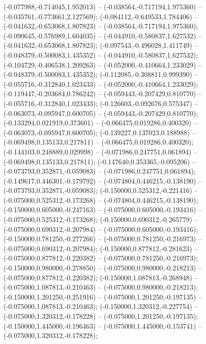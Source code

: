  (-0.077988,-0.714045,1.952013) -- (-0.038564,-0.717194,1.975360) -- (-0.035761,-0.773661,2.127569);
 (-0.084112,-0.649533,1.784406) -- (-0.041632,-0.653068,1.807823) -- (-0.038564,-0.717194,1.975360);
 (-0.090645,-0.576989,1.604035) -- (-0.044910,-0.580837,1.627532) -- (-0.041632,-0.653068,1.807823);
 (-0.097543,-0.496028,1.411749) -- (-0.048379,-0.500083,1.435352) -- (-0.044910,-0.580837,1.627532);
 (-0.104729,-0.406538,1.209263) -- (-0.052000,-0.410664,1.233029) -- (-0.048379,-0.500083,1.435352);
 (-0.112085,-0.308811,0.999390) -- (-0.055716,-0.312840,1.023433) -- (-0.052000,-0.410664,1.233029);
 (-0.119447,-0.203684,0.786242) -- (-0.059443,-0.207429,0.810770) -- (-0.055716,-0.312840,1.023433);
 (-0.126603,-0.092676,0.575347) -- (-0.063073,-0.095947,0.600705) -- (-0.059443,-0.207429,0.810770);
 (-0.133294,0.021919,0.373601) -- (-0.066475,0.019286,0.400320) -- (-0.063073,-0.095947,0.600705);
 (-0.139227,0.137023,0.188988) -- (-0.069498,0.135133,0.217811) -- (-0.066475,0.019286,0.400320);
 (-0.144103,0.248889,0.029998) -- (-0.071986,0.247751,0.061894) -- (-0.069498,0.135133,0.217811);
 (-0.147640,0.353365,-0.095206) -- (-0.073793,0.352871,-0.059083) -- (-0.071986,0.247751,0.061894);
 (-0.149617,0.446301,-0.179792) -- (-0.074804,0.446215,-0.138190) -- (-0.073793,0.352871,-0.059083);
 (-0.150000,0.525312,-0.221416) -- (-0.075000,0.525312,-0.173268) -- (-0.074804,0.446215,-0.138190);
 (-0.150000,0.605000,-0.247163) -- (-0.075000,0.605000,-0.193416) -- (-0.075000,0.525312,-0.173268);
 (-0.150000,0.690312,-0.265779) -- (-0.075000,0.690312,-0.207984) -- (-0.075000,0.605000,-0.193416);
 (-0.150000,0.781250,-0.277266) -- (-0.075000,0.781250,-0.216973) -- (-0.075000,0.690312,-0.207984);
 (-0.150000,0.877812,-0.281623) -- (-0.075000,0.877812,-0.220382) -- (-0.075000,0.781250,-0.216973);
 (-0.150000,0.980000,-0.278850) -- (-0.075000,0.980000,-0.218213) -- (-0.075000,0.877812,-0.220382);
 (-0.150000,1.087813,-0.268948) -- (-0.075000,1.087813,-0.210463) -- (-0.075000,0.980000,-0.218213);
 (-0.150000,1.201250,-0.251916) -- (-0.075000,1.201250,-0.197135) -- (-0.075000,1.087813,-0.210463);
 (-0.150000,1.320312,-0.227754) -- (-0.075000,1.320312,-0.178228) -- (-0.075000,1.201250,-0.197135);
 (-0.150000,1.445000,-0.196463) -- (-0.075000,1.445000,-0.153741) -- (-0.075000,1.320312,-0.178228);
